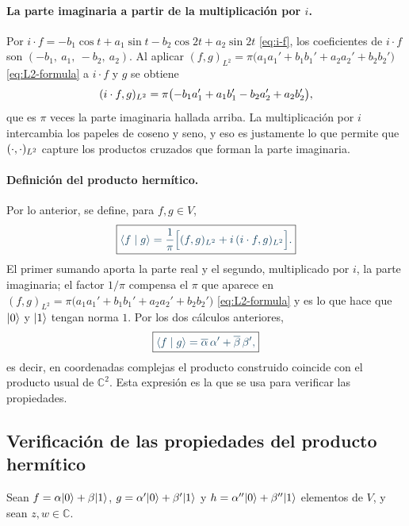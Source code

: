 \paragraph{La parte imaginaria a partir de la multiplicación por $i$.}
Por $i\cdot f=-b_1\cos t+a_1\sin t-b_2\cos 2t+a_2\sin 2t$ \eqref{eq:i-f}, los coeficientes de $i\cdot f$ son $(-b_1,\ a_1,\ -b_2,\ a_2)$. Al aplicar
$(f,g)_{L^2}=\pi\bigl(a_1a_1'+b_1b_1'+a_2a_2'+b_2b_2'\bigr)$ \eqref{eq:L2-formula} a $i\cdot f$ y $g$ se obtiene
\[
  (i\cdot f,g)_{L^2}=\pi\bigl(-b_1a_1'+a_1b_1'-b_2a_2'+a_2b_2'\bigr),
\]
que es $\pi$ veces la parte imaginaria hallada arriba. La multiplicación por $i$ intercambia
los papeles de coseno y seno, y eso es justamente lo que permite que $(\cdot,\cdot)_{L^2}$ capture
los productos cruzados que forman la parte imaginaria.

\paragraph{Definición del producto hermítico.}
Por lo anterior, se define, para $f,g\in V$,
\begin{equation}\label{eq:hermitico}
  \destacado{\bk fg=\frac1\pi\Bigl[\Lp fg+i\,\Lp{i\cdot f}{g}\Bigr].}
\end{equation}
El primer sumando aporta la parte real y el segundo, multiplicado por $i$, la parte
imaginaria; el factor $1/\pi$ compensa el $\pi$ que aparece en $(f,g)_{L^2}=\pi\bigl(a_1a_1'+b_1b_1'+a_2a_2'+b_2b_2'\bigr)$ \eqref{eq:L2-formula} y es lo
que hace que $\lvert 0\rangle$ y $\lvert 1\rangle$ tengan norma $1$. Por los dos cálculos anteriores,
\begin{equation}\label{eq:hermitico-coord}
  \destacado{\bk fg=\overline\alpha\,\alpha'+\overline\beta\,\beta' ,}
\end{equation}
es decir, en coordenadas complejas el producto construido coincide con el producto usual de
$\mathbb C^2$. Esta expresión es la que se usa para verificar las propiedades.

\subsection*{Verificación de las propiedades del producto hermítico}

Sean $f=\alpha\lvert 0\rangle+\beta\lvert 1\rangle$, $g=\alpha'\lvert 0\rangle+\beta'\lvert 1\rangle$ y $h=\alpha''\lvert 0\rangle+\beta''\lvert 1\rangle$
elementos de $V$, y sean $z,w\in\mathbb C$.

